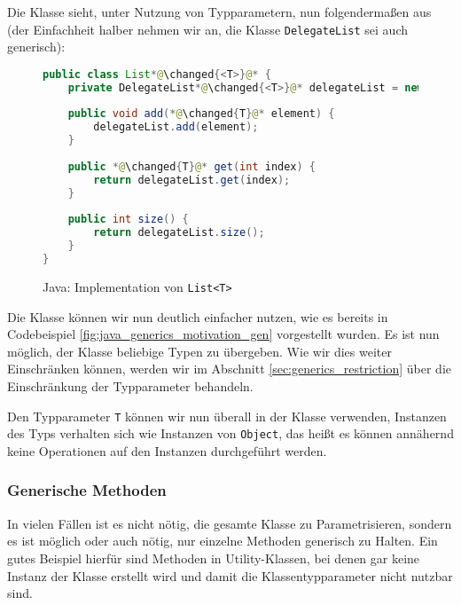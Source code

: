 		Die Klasse sieht, unter Nutzung von Typparametern, nun folgendermaßen aus (der Einfachheit halber nehmen wir an, die Klasse \texttt{DelegateList} sei auch generisch):
		\begin{figure}[H]
			\centering
			\begin{lstlisting}[language = Java]
public class List*@\changed{<T>}@* {
	private DelegateList*@\changed{<T>}@* delegateList = new DelegateList*@\changed{<T>}@*();
	
	public void add(*@\changed{T}@* element) {
		delegateList.add(element);
	}
	
	public *@\changed{T}@* get(int index) {
		return delegateList.get(index);
	}
	
	public int size() {
		return delegateList.size();
	}
}
			\end{lstlisting}
			\caption{Java: Implementation von \texttt{List<T>}}
		\end{figure}
		
		Die Klasse können wir nun deutlich einfacher nutzen, wie es bereits in Codebeispiel \ref{fig:java_generics_motivation_gen} vorgestellt wurden. Es ist nun möglich, der Klasse beliebige Typen zu übergeben. Wie wir dies weiter Einschränken können, werden wir im Abschnitt \ref{sec:generics_restriction} über die Einschränkung der Typparameter behandeln.
		
		Den Typparameter \texttt{T} können wir nun überall in der Klasse verwenden, Instanzen des Typs verhalten sich wie Instanzen von \texttt{Object}, das heißt es können annähernd keine Operationen auf den Instanzen durchgeführt werden.
		
		
	
	\subsubsection{Generische Methoden}
		In vielen Fällen ist es nicht nötig, die gesamte Klasse zu Parametrisieren, sondern es ist möglich oder auch nötig, nur einzelne Methoden generisch zu Halten. Ein gutes Beispiel hierfür sind Methoden in Utility-Klassen, bei denen gar keine Instanz der Klasse erstellt wird und damit die Klassentypparameter nicht nutzbar sind.
		
